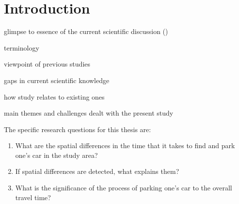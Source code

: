 \section{Introduction}
\justify
glimpse to essence of the current scientific discussion (\cite{Geurs2004})  \par
terminology \par
viewpoint of previous studies \par
gaps in current scientific knowledge \par
how study relates to existing ones \par
main themes and challenges dealt with the present study \par

\noindent
The specific research questions for this thesis are:

\begin{spacing}{1}
\begin{enumerate}[label=\Roman*] %
  \item What are the spatial differences in the time that it takes to find and park one’s car in the study area?
  \item If spatial differences are detected, what explains them?
  \item What is the significance of the process of parking one’s car to the overall travel time?
\end{enumerate}
\end{spacing}